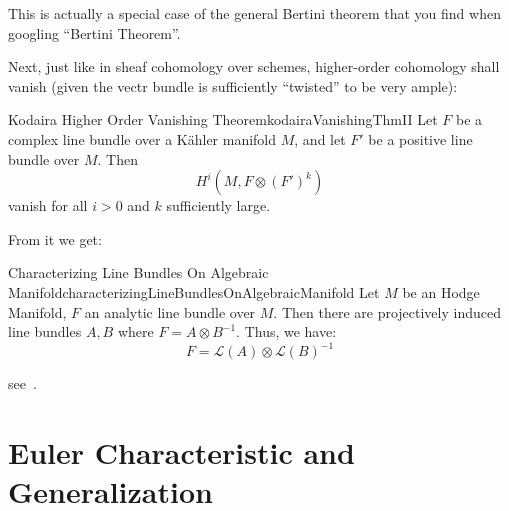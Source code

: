 \documentclass{book}
\newcommand{\CL}{{\mathcal{L}}}
\begin{document}
This is actually a special case of the general Bertini theorem that you find when googling ``Bertini
Theorem''.

\begin{Proof}
  \cite{voisinHodgeTheoryComplex2002}
\end{Proof}

Next, just like in sheaf cohomology over schemes, higher-order cohomology shall vanish (given the vectr bundle
is sufficiently ``twisted'' to be very ample):

\begin{thm}{Kodaira Higher Order Vanishing Theorem}{kodairaVanishingThmII}
  Let $F$ be a complex line bundle over a K\"ahler manifold $M$, and let $F'$ be a positive line bundle over $M$.
  Then
  \[
    H^i(M, F\otimes (F')^k)
  \]
  vanish for all $i > 0$ and $k$ sufficiently large.
\end{thm}

\begin{Proof}
  \cite{voisinHodgeTheoryComplex2002}
\end{Proof}

From it we get:

\begin{thm}{Characterizing Line Bundles On Algebraic Manifold}{characterizingLineBundlesOnAlgebraicManifold}
  Let $M$ be an Hodge Manifold, $F$ an analytic line bundle over $M$. Then there are projectively induced
  line bundles $A,B$ where $F = A\otimes B^{-1}$. Thus, we have:
  \[
    F = \CL(A)\otimes \CL(B)^{-1}
  \]
\end{thm}

\begin{Proof}
  see~\cite[p.141, thm~18.2.5]{hirzebruchTopologicalMethodsAlgebraic1995}.
\end{Proof}

\section{Euler Characteristic and Generalization}\label{sec:eulerCharAndGeneralization}
\end{document}
